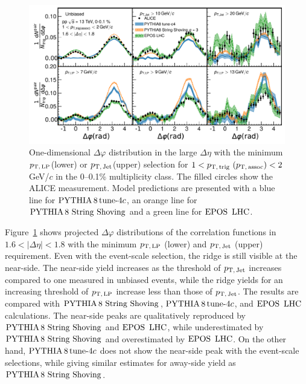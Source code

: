 \begin{figure}[h!]
	\centering
	\includegraphics[width=0.99\linewidth]{./figures/Fig5_PlotDeltaPhiESE.pdf}
	\caption{ One-dimensional $\Delta\varphi$ distribution in the large $\Delta\eta$ with the minimum $p_\mathrm{T,\,LP}$(lower) or $p_\mathrm{T,\,Jet}$(upper) selection for $1< p_\mathrm{T,\,trig}~\mathrm (p_\mathrm{T,\,assoc}) <2$ GeV/$c$ in the 0--0.1\% multiplicity class. The filled circles show the ALICE measurement. Model predictions are presented with a blue line for $\mathrm{PYTHIA}\,8\,\mathrm{tune}{\text -}4c$, an orange line for ${\mathrm{PYTHIA}\,8~\mathrm{String}~}\mathrm{Shoving}$ and a green line for ${\mathrm{EPOS}\,~\mathrm{LHC}}$.}
	\label{fig:PlotDeltaPhiESE}
\end{figure}

Figure~\ref{fig:PlotDeltaPhiESE} shows projected $\Delta\varphi$ distributions of the correlation functions in $1.6<|\Delta\eta|<1.8$ with the minimum $p_\mathrm{T,\,LP}$ (lower) and $p_\mathrm{T,\,Jet}$ (upper) requirement. Even with the event-scale selection, the ridge is still visible at the near-side. The near-side yield increases as the threshold of $p_\mathrm{T,\,Jet}$ increases compared to one measured in unbiased events, while the ridge yields for an increasing threshold of $p_\mathrm{T,\,LP}$ increase less than those of $p_\mathrm{T,\,Jet}$. The results are compared with ${\mathrm{PYTHIA}\,8~\mathrm{String}~}\mathrm{Shoving}$, $\mathrm{PYTHIA}\,8\,\mathrm{tune}{\text -}4c$, and ${\mathrm{EPOS}\,~\mathrm{LHC}}$ calculations. The near-side peaks are qualitatively reproduced by ${\mathrm{PYTHIA}\,8~\mathrm{String}~}\mathrm{Shoving}$ and ${\mathrm{EPOS}\,~\mathrm{LHC}}$, while underestimated by ${\mathrm{PYTHIA}\,8~\mathrm{String}~}\mathrm{Shoving}$ and overestimated by ${\mathrm{EPOS}\,~\mathrm{LHC}}$. On the other hand, $\mathrm{PYTHIA}\,8\,\mathrm{tune}{\text -}4c$ does not show the near-side peak with the event-scale selections, while giving similar estimates for away-side yield as ${\mathrm{PYTHIA}\,8~\mathrm{String}~}\mathrm{Shoving}$.

